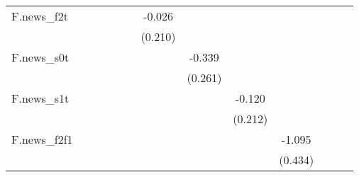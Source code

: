 {\begin{tabular}{l*{12}{c}}
\addlinespace
F.news\_f2t  &                     &                     &                     &                     &                     &      -0.026         &                     &                     &                     &                     &                     &                     \\
            &                     &                     &                     &                     &                     &     (0.210)         &                     &                     &                     &                     &                     &                     \\
\addlinespace
F.news\_s0t  &                     &                     &                     &                     &                     &                     &      -0.339         &                     &                     &                     &                     &                     \\
            &                     &                     &                     &                     &                     &                     &     (0.261)         &                     &                     &                     &                     &                     \\
\addlinespace
F.news\_s1t  &                     &                     &                     &                     &                     &                     &                     &      -0.120         &                     &                     &                     &                     \\
            &                     &                     &                     &                     &                     &                     &                     &     (0.212)         &                     &                     &                     &                     \\
\addlinespace
F.news\_f2f1 &                     &                     &                     &                     &                     &                     &                     &                     &      -1.095\sym{**} &                     &                     &                     \\
            &                     &                     &                     &                     &                     &                     &                     &                     &     (0.434)         &                     &                     &                     \\

\end{tabular}}
